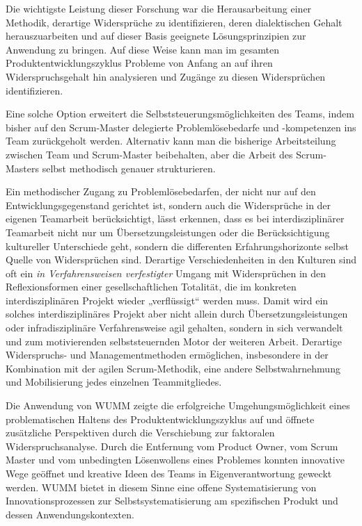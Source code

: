 \documentclass[a4paper,11pt]{article}
\begin{document}
Die wichtigste Leistung dieser Forschung war die Herausarbeitung einer
Methodik, derartige Widersprüche zu identifizieren, deren dialektischen Gehalt
herauszuarbeiten und auf dieser Basis geeignete Lösungsprinzipien zur
Anwendung zu bringen. Auf diese Weise kann man im gesamten
Produktentwicklungszyklus Probleme von Anfang an auf ihren Widerspruchsgehalt
hin analysieren und Zugänge zu diesen Widersprüchen identifizieren.

Eine solche Option erweitert die Selbststeuerungsmöglichkeiten des Teams,
indem bisher auf den Scrum-Master delegierte Problemlösebedarfe und
-kompetenzen ins Team zurückgeholt werden. Alternativ kann man die bisherige
Arbeitsteilung zwischen Team und Scrum-Master beibehalten, aber die Arbeit des
Scrum-Masters selbst methodisch genauer strukturieren.

Ein methodischer Zugang zu Problemlösebedarfen, der nicht nur auf den
Entwicklungsgegenstand gerichtet ist, sondern auch die Widersprüche in der
eigenen Teamarbeit berücksichtigt, lässt erkennen, dass es bei
interdisziplinärer Teamarbeit nicht nur um Übersetzungsleistungen oder die
Berücksichtigung kultureller Unterschiede geht, sondern die differenten
Erfahrungshorizonte selbst Quelle von Widersprüchen sind.  Derartige
Verschiedenheiten in den Kulturen sind oft ein \emph{in Verfahrensweisen
  verfestigter} Umgang mit Widersprüchen in den Reflexionsformen einer
gesellschaftlichen Totalität, die im konkreten interdisziplinären Projekt
wieder „verflüssigt“ werden muss.  Damit wird ein solches interdisziplinäres
Projekt aber nicht allein durch Übersetzungsleistungen oder infradisziplinäre
Verfahrensweise agil gehalten, sondern in sich verwandelt und zum
motivierenden selbststeuernden Motor der weiteren Arbeit. Derartige
Widerspruchs- und Managementmethoden ermöglichen, insbesondere in der
Kombination mit der agilen Scrum-Methodik, eine andere Selbstwahrnehmung und
Mobilisierung jedes einzelnen Teammitgliedes.

Die Anwendung von WUMM zeigte die erfolgreiche Umgehungsmöglichkeit eines
problematischen Haltens des Produktentwicklungszyklus auf und öffnete
zusätzliche Perspektiven durch die Verschiebung zur faktoralen
Widerspruchsanalyse. Durch die Entfernung vom Product Owner, vom Scrum Master
und vom unbedingten Lösenwollens eines Problemes konnten innovative Wege
geöffnet und kreative Ideen des Teams in Eigenverantwortung geweckt werden.
WUMM bietet in diesem Sinne eine offene Systematisierung von
Innovationsprozessen zur Selbstsystematisierung am spezifischen Produkt und
dessen Anwendungskontexten.
\end{document}
